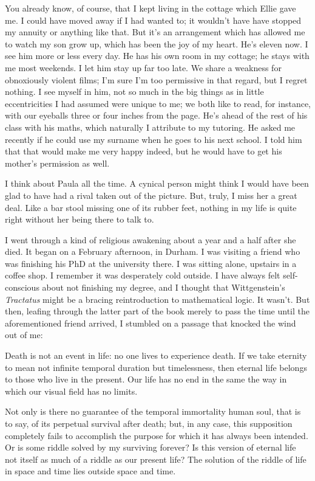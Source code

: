 You already know, of course, that I kept living in the cottage which Ellie gave me. I could have moved away if I had wanted to; it wouldn't have have stopped my annuity or anything like that. But it's an arrangement which has allowed me to watch my son grow up, which has been the joy of my heart. He's eleven now. I see him more or less every day. He has his own room in my cottage; he stays with me most weekends. I let him stay up far too late. We share a weakness for obnoxiously violent films; I'm sure I'm too permissive in that regard, but I regret nothing. I see myself in him, not so much in the big things as in little eccentricities I had assumed were unique to me; we both like to read, for instance, with our eyeballs three or four inches from the page. He's ahead of the rest of his class with his maths, which naturally I attribute to my tutoring. He asked me recently if he could use my surname when he goes to his next school. I told him that that would make me very happy indeed, but he would have to get his mother's permission as well.

I think about Paula all the time. A cynical person might think I would have been glad to have had a rival taken out of the picture. But, truly, I miss her a great deal. Like a bar stool missing one of its rubber feet, nothing in my life is quite right without her being there to talk to.

I went through a kind of religious awakening about a year and a half after she died. It began on a February afternoon, in Durham. I was visiting a friend who was finishing his PhD at the university there. I was sitting alone, upstairs in a coffee shop. I remember it was desperately cold outside. I have always felt self-conscious about not finishing my degree, and I thought that Wittgenstein's \textit{Tractatus} might be a bracing reintroduction to mathematical logic. It wasn't. But then, leafing through the latter part of the book merely to pass the time until the aforementioned friend arrived, I stumbled on a passage that knocked the wind out of me:

\begin{quoting}
    Death is not an event in life: no one lives to experience death. If we take eternity to mean not infinite temporal duration but timelessness, then eternal life belongs to those who live in the present. Our life has no end in the same the way in which our visual field has no limits.

    Not only is there no guarantee of the temporal immortality human soul, that is to say, of its perpetual survival after death; but, in any case, this supposition completely fails to accomplish the purpose for which it has always been intended. Or is some riddle solved by my surviving forever? Is this version of eternal life not itself as much of a riddle as our present life? The solution of the riddle of life in space and time lies outside space and time.
\end{quoting}

